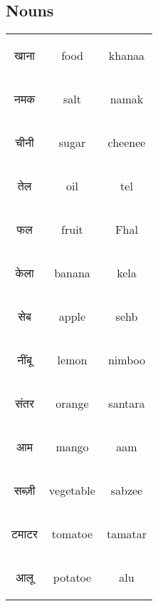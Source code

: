 \subsection{Nouns}
\begin{table}[H]
    \centering
    \begin{tabular}{c|c|c}
        \begin{hindi} खाना \end{hindi} & food & khanaa \\
        \begin{hindi} नमक \end{hindi} & salt & namak \\
        \begin{hindi} चीनी \end{hindi} & sugar & cheenee \\
        \begin{hindi} तेल \end{hindi} & oil & tel \\
        \begin{hindi} फल \end{hindi} & fruit & Fhal \\ 
        \begin{hindi} केला \end{hindi} & banana & kela \\
        \begin{hindi} सेब \end{hindi} & apple & sehb \\
        \begin{hindi} नींबू \end{hindi} & lemon & nimboo \\
        \begin{hindi} संतर \end{hindi} & orange & santara \\
        \begin{hindi} आम \end{hindi} & mango & aam \\ 
        \begin{hindi} सब्ज़ी \end{hindi} & vegetable & sabzee \\ 
        \begin{hindi} टमाटर \end{hindi} & tomatoe & tamatar \\
        \begin{hindi} आलू \end{hindi} & potatoe & alu \\

\end{tabular}
\end{table}
